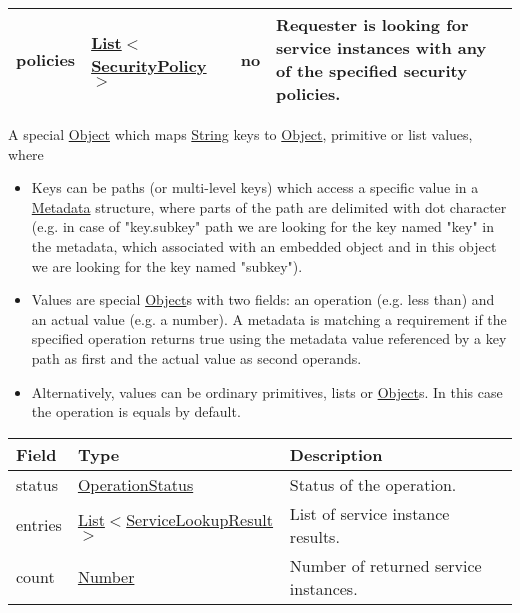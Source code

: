 \documentclass[a4paper]{arrowhead}
\newcommand{\pref}[1]{{\textcolor{ArrowheadGrey}{\hyperref[sec:model:primitives:#1]{#1}}}}
\begin{document}
\begin{table}[ht!]
\begin{tabularx}{\textwidth}{| p{5.3cm} | p{4.8cm} | p{2cm} | X |} \hline
policies &  \pref{List}$<$\pref{SecurityPolicy}$>$ & no & Requester is looking for service ins\-tances with any of the specified security policies. \\ \hline
\end{tabularx}
\end{table}

\label{sec:model:MetadataRequirements}

A special \pref{Object} which maps \pref{String} keys to \pref{Object}, primitive or list values, where 

\begin{itemize}
    \item Keys can be paths (or multi-level keys) which access a specific value in a \hyperref[sec:model:Metadata]{Metadata} structure, where parts of the path are delimited with dot character (e.g. in case of "key.subkey" path we are looking for the key named "key" in the metadata, which associated with an embedded object and in this object we are looking for the key named "subkey").
    \item Values are special \pref{Object}s with two fields: an operation (e.g. less than) and an actual value (e.g. a number). A metadata is matching a requirement if the specified operation returns true using the metadata value referenced by a key path as first and the actual value as second operands. 
    \item Alternatively, values can be ordinary primitives, lists or \pref{Object}s. In this case the operation is equals by default.
\end{itemize}

\label{sec:model:ServiceLookupResponse}

\begin{table}[ht!]
\begin{tabularx}{\textwidth}{| p{3cm} | p{6cm} | X |} \hline
\rowcolor{gray!33} Field & Type      & Description \\ \hline
status & \pref{OperationStatus} & Status of the operation. \\ \hline
entries & \pref{List}$<$\hyperref[sec:model:ServiceLookupResult]{ServiceLookupResult}$>$     & List of service instance results. \\ \hline
count & \pref{Number} & Number of returned service instances. \\ \hline
\end{tabularx}
\end{table}
\end{document}
